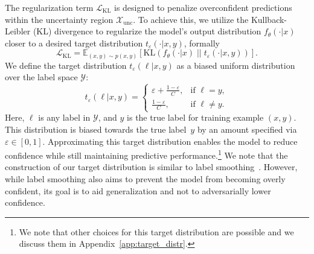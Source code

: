 The regularization term \(\mathcal{L}_\text{KL}\) is designed to penalize overconfident predictions within the uncertainty region \(\mathcal{X}_\text{unc}\). To achieve this, we utilize the Kullback-Leibler (KL) divergence to regularize the model's output distribution \(f_\theta(\cdot|x)\) closer to a desired target distribution \(t_\varepsilon(\cdot|x,y)\), formally %
\begin{equation}
    \mathcal{L}_\text{KL} = \mathbb{E}_{(x,y) \sim p(x, y)} \left[ \text{KL}\left(f_\theta(\cdot|x) \; \big|\big| \; t_\varepsilon(\cdot|x,y)\right) \right].
\end{equation}
We define the target distribution \(t_\varepsilon(\ell|x,y)\) as a biased uniform distribution over the label space \(\mathcal{Y}\):
\begin{equation}
\label{eq:target_dist}
t_\varepsilon(\ell|x, y) =
\begin{cases}
\varepsilon + \frac{1 - \varepsilon}{C}, & \text{if } \ell = y, \\
\frac{1 - \varepsilon}{C}, & \text{if } \ell \neq y.
\end{cases}
\end{equation}
Here, \(\ell\) is any label in \(\mathcal{Y}\), and \(y\) is the true label for training example \((x,y)\). This distribution is biased towards the true label~\(y\) by an amount specified via $\varepsilon \in [0,1]$. Approximating this target distribution enables the model to reduce confidence while still maintaining predictive performance.\footnote{We note that other choices for this target distribution are possible and we discuss them in Appendix~\ref{app:target_distr}.} 
We note that the construction of our target distribution is similar to label smoothing~\citep{szegedy2016rethinking}. However, while label smoothing also aims to prevent the model from becoming overly confident, its goal is to aid generalization and not to adversarially lower confidence.


